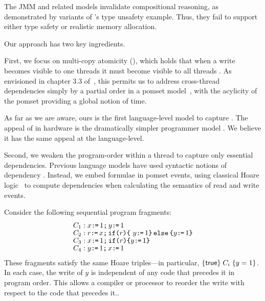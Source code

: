 The JMM and  related models \citep{DBLP:conf/esop/JagadeesanPR10,DBLP:conf/popl/KangHLVD17,Chakraborty:2019} invalidate compositional reasoning, as demonstrated by variants of \citeauthor{DBLP:journals/toplas/Lochbihler13}'s type unsafety example.  Thus, they fail to support either type safety or realistic memory allocation.


Our approach has two key ingredients.  

First, we focus on multi-copy atomicity (\mca), which holds that when a write becomes visible to one threads it must become visible to all threads  \citep{DBLP:journals/pacmpl/PulteFDFSS18}.  As envisioned in chapter 3.3 of~\citet{AlglaveThesis},  this permits us to address cross-thread dependencies simply by a partial order in a pomset model~\citep{GISCHER1988199,Plotkin:1997:TSP:266557.266600}, with the acylicity of the pomset providing a global notion of time.  

As far as we are aware, ours is the first language-level model to capture \mca.   The appeal of \mca{} in hardware is the dramatically simpler programmer model \citep{DBLP:journals/pacmpl/PulteFDFSS18}.  We believe it has the same appeal at the language-level.  

Second, we weaken the program-order within a thread to capture only essential dependencies.
Previous language models have used syntactic notions of dependency \cite{Batty:2011:MCC:1926385.1926394}.
Instead, we embed formulae in pomset events, using classical
Hoare logic~\citep{Hoare:1969:ABC:363235.363259, gordonHoare} to compute dependencies when calculating the semantics of read and write events. %

Consider the following sequential program fragments:
\begin{align*}
& C_1: x \texttt{:}\mkern-1mu\texttt{=}\, 1 \texttt{;}\,\allowbreak y \texttt{:}\mkern-1mu\texttt{=}\, 1 \\[-1ex]
& C_2: r \texttt{:}\mkern-1mu\texttt{=}\, x \texttt{;}\,\allowbreak \texttt{if}\allowbreak\texttt{(}r\texttt{)} \allowbreak\texttt{\{}\ y \texttt{:}\mkern-1mu\texttt{=}\, 1 \texttt{\}}\,\allowbreak\texttt{else}\allowbreak\,\texttt{\{} y \texttt{:}\mkern-1mu\texttt{=}\, 1  \texttt{\}} \\[-1ex]
& C_3: x \texttt{:}\mkern-1mu\texttt{=}\, 1 \texttt{;}\,\allowbreak \texttt{if}\allowbreak\texttt{(}r\texttt{)} \allowbreak\texttt{\{} y \texttt{:}\mkern-1mu\texttt{=}\, 1 \texttt{\}} \\[-1ex]
&C_4:  y \texttt{:}\mkern-1mu\texttt{=}\, 1 \texttt{;}\,\allowbreak x \texttt{:}\mkern-1mu\texttt{=}\, 1
\end{align*}
These fragments satisfy the same Hoare triples---in particular, $\{\mathsf{true}\}\allowbreak\;C_i\;\allowbreak\{y =1\}$.  In each case, the write of $y$ is independent of
any code that precedes it in program order.  This allows a compiler or processor to reorder the write with respect to the code that precedes it..


